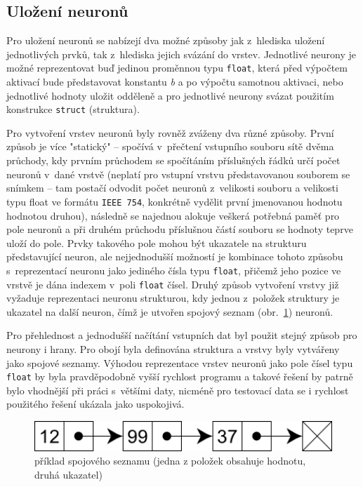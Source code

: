 \documentclass[12pt, a4paper, titlepage]{report}
\begin{document}
\subsection{Uložení neuronů}
Pro uložení neuronů se nabízejí dva možné způsoby jak z~hlediska uložení jednotlivých prvků, tak z~hlediska jejich svázání do vrstev. Jednotlivé neurony je možné reprezentovat buď jedinou proměnnou typu \texttt{float}, která před výpočtem aktivací bude představovat konstantu \textit{b} a po výpočtu samotnou aktivaci, nebo jednotlivé hodnoty uložit odděleně a pro jednotlivé neurony svázat použitím konstrukce \texttt{struct} (struktura).\par
Pro vytvoření vrstev neuronů byly rovněž zváženy dva různé způsoby. První způsob je více "statický" – spočívá v~přečtení vstupního souboru sítě dvěma průchody, kdy prvním průchodem se spočítáním příslušných řádků určí počet neuronů v~dané vrstvě (neplatí pro vstupní vrstvu představovanou souborem se snímkem – tam postačí odvodit počet neuronů z~velikosti souboru a velikosti typu float ve formátu \texttt{IEEE 754}, konkrétně vydělit první jmenovanou hodnotu hodnotou druhou), následně se najednou alokuje veškerá potřebná paměť pro pole neuronů a při druhém průchodu příslušnou částí souboru se hodnoty teprve uloží do pole. Prvky takového pole mohou být ukazatele na strukturu představující neuron, ale nejjednodušší možností je kombinace tohoto způsobu s~reprezentací neuronu jako jediného čísla typu \texttt{float}, přičemž jeho pozice ve vrstvě je dána indexem v~poli \texttt{float} čísel. Druhý způsob vytvoření vrstvy již vyžaduje reprezentaci neuronu strukturou, kdy jednou z~položek struktury je ukazatel na další neuron, čímž je utvořen spojový seznam (obr.~\ref{fig:list}) neuronů.\par
Pro přehlednost a jednodušší načítání vstupních dat byl použit stejný způsob pro neurony i hrany. Pro obojí byla definována struktura a vrstvy byly vytvářeny jako spojové seznamy. Výhodou reprezentace vrstev neuronů jako pole čísel typu \texttt{float} by byla pravděpodobně vyšší rychlost programu a takové řešení by patrně bylo vhodnější při práci s~většími daty, nicméně pro testovací data se i rychlost použitého řešení ukázala jako uspokojivá.
\begin{figure}[htbp]
    \centering
    \includegraphics[width=12cm]{img/list.png}
    \caption{příklad spojového seznamu (jedna z položek obsahuje hodnotu, druhá ukazatel)}
    \label{fig:list}
\end{figure}
\end{document}
